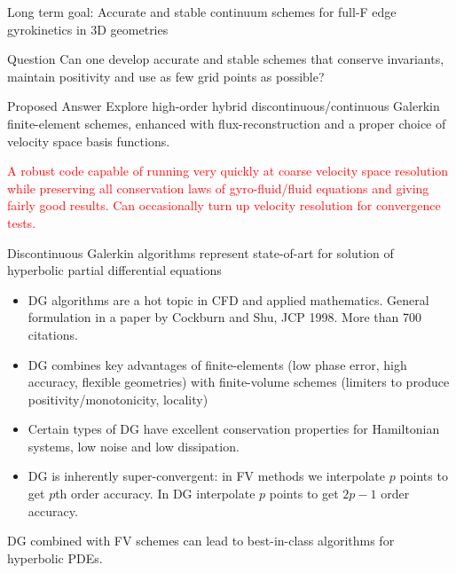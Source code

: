 \documentclass[pdf]{beamer}
\newcommand{\mypause}{}
\theoremstyle{definition}
\begin{document}
\begin{frame}{Long term goal: Accurate and stable continuum schemes
    for full-F edge gyrokinetics in 3D geometries}

  \begin{block}{Question}
    Can one develop accurate and stable schemes that conserve
    invariants, maintain positivity and use as few grid points as
    possible?
  \end{block}

  \begin{block}{Proposed Answer}
    Explore high-order hybrid discontinuous/continuous Galerkin
    finite-element schemes, enhanced with flux-reconstruction and a
    proper choice of velocity space basis functions.
  \end{block}
  \mypause \textcolor{red}{A robust code capable of running very
    quickly at coarse velocity space resolution while preserving all
    conservation laws of gyro-fluid/fluid equations and giving fairly
    good results. Can occasionally turn up velocity resolution for
    convergence tests.}

\end{frame}

\begin{frame}{Discontinuous Galerkin algorithms represent state-of-art
    for solution of hyperbolic partial differential equations}
  \begin{itemize}
  \item DG algorithms are a hot topic in CFD and applied
    mathematics. General formulation in a paper by Cockburn and Shu,
    JCP 1998. More than 700 citations.  \mypause
  \item DG combines key advantages of finite-elements (low phase
    error, high accuracy, flexible geometries) with finite-volume
    schemes (limiters to produce positivity/monotonicity, locality)
    \mypause
  \item Certain types of DG have excellent conservation properties for
    Hamiltonian systems, low noise and low dissipation.
    \mypause
  \item DG is inherently super-convergent: in FV methods we
    interpolate $p$ points to get $p$th order accuracy. In DG
    interpolate $p$ points to get $2p-1$ order accuracy.
  \end{itemize}
  DG combined with FV schemes can lead to best-in-class algorithms
  for hyperbolic PDEs.

\end{frame}
\end{document}
